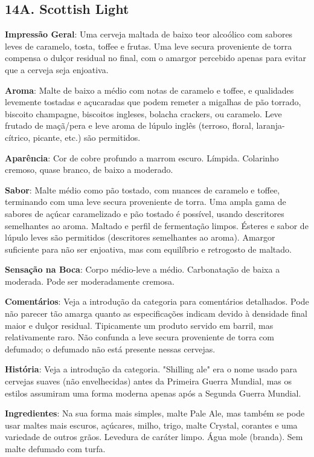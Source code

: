 \subsection*{14A. Scottish Light}
\textbf{Impressão Geral}: Uma cerveja maltada de baixo teor alcoólico com sabores leves de caramelo, tosta, toffee e frutas. Uma leve secura proveniente de torra compensa o dulçor residual no final, com o amargor percebido apenas para evitar que a cerveja seja enjoativa.

\textbf{Aroma}: Malte de baixo a médio com notas de caramelo e toffee, e qualidades levemente tostadas e açucaradas que podem remeter a migalhas de pão torrado, biscoito champagne, biscoitos ingleses, bolacha crackers, ou caramelo. Leve frutado de maçã/pera e leve aroma de lúpulo inglês (terroso, floral, laranja-cítrico, picante, etc.) são permitidos.

\textbf{Aparência}: Cor de cobre profundo a marrom escuro. Límpida. Colarinho cremoso, quase branco, de baixo a moderado.

\textbf{Sabor}: Malte médio como pão tostado, com nuances de caramelo e toffee, terminando com uma leve secura proveniente de torra. Uma ampla gama de sabores de açúcar caramelizado e pão tostado é possível, usando descritores semelhantes ao aroma. Maltado e perfil de fermentação limpos. Ésteres e sabor de lúpulo leves são permitidos (descritores semelhantes ao aroma). Amargor suficiente para não ser enjoativa, mas com equilíbrio e retrogosto de maltado.

\textbf{Sensação na Boca}: Corpo médio-leve a médio. Carbonatação de baixa a moderada. Pode ser moderadamente cremosa.

\textbf{Comentários}: Veja a introdução da categoria para comentários detalhados. Pode não parecer tão amarga quanto as especificações indicam devido à densidade final maior e dulçor residual. Tipicamente um produto servido em barril, mas relativamente raro. Não confunda  a leve secura proveniente de torra com defumado; o defumado não está presente nessas cervejas.

\textbf{História}: Veja a introdução da categoria. "Shilling ale" era o nome usado para cervejas suaves (não envelhecidas) antes da Primeira Guerra Mundial, mas os estilos assumiram uma forma moderna apenas após a Segunda Guerra Mundial.

\textbf{Ingredientes}: Na sua forma mais simples, malte Pale Ale, mas também se pode usar maltes mais escuros, açúcares, milho, trigo, malte Crystal, corantes e uma variedade de outros grãos. Levedura de caráter limpo. Água mole (branda). Sem malte defumado com turfa.

